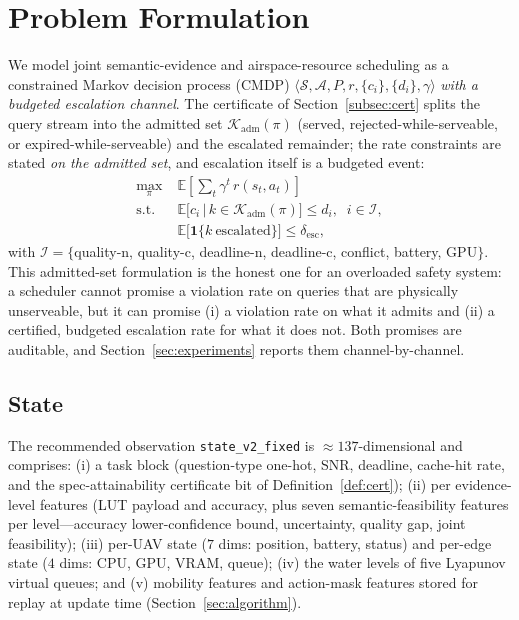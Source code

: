 \section{Problem Formulation}\label{sec:problem}

We model joint semantic-evidence and airspace-resource scheduling as a
constrained Markov decision process (CMDP)
$\langle\mathcal{S},\mathcal{A},P,r,\{c_i\},\{d_i\},\gamma\rangle$
\emph{with a budgeted escalation channel}. The certificate of
Section~\ref{subsec:cert} splits the query stream into the admitted set
$\mathcal{K}_{\mathrm{adm}}(\pi)$ (served, rejected-while-serveable, or
expired-while-serveable) and the escalated remainder; the rate constraints
are stated \emph{on the admitted set}, and escalation itself is a budgeted
event:
\begin{align}\label{eq:cmdp}
\max_{\pi}\;&\mathbb{E}\!\left[\sum_{t}\gamma^{t}\,r(s_t,a_t)\right]\\
\text{s.t.}\;\;
&\mathbb{E}\big[c_i \,\big|\, k\in\mathcal{K}_{\mathrm{adm}}(\pi)\big]\le d_i,
\;\; i\in\mathcal{I},\nonumber\\
&\mathbb{E}\big[\mathbf{1}\{k\ \text{escalated}\}\big]\le
\delta_{\mathrm{esc}},\nonumber
\end{align}
with $\mathcal{I}=\{$quality-n, quality-c, deadline-n, deadline-c, conflict,
battery, GPU$\}$. This admitted-set formulation is the honest one for an
overloaded safety system: a scheduler cannot promise a violation rate on
queries that are physically unserveable, but it can promise (i) a violation
rate on what it admits and (ii) a certified, budgeted escalation rate for
what it does not. Both promises are auditable, and Section~\ref{sec:experiments}
reports them channel-by-channel.

\subsection{State}
The recommended observation \texttt{state\_v2\_fixed} is
$\approx\!137$-dimensional and comprises: (i) a task block
(question-type one-hot, SNR, deadline, cache-hit rate, and the
spec-attainability certificate bit of Definition~\ref{def:cert}); (ii) per
evidence-level features (LUT payload and accuracy, plus seven
semantic-feasibility features per level---accuracy lower-confidence bound,
uncertainty, quality gap, joint feasibility); (iii) per-UAV state
($7$ dims: position, battery, status) and per-edge state ($4$ dims: CPU,
GPU, VRAM, queue); (iv) the water levels of five Lyapunov virtual queues;
and (v) mobility features and action-mask features stored for replay at
update time (Section~\ref{sec:algorithm}).

